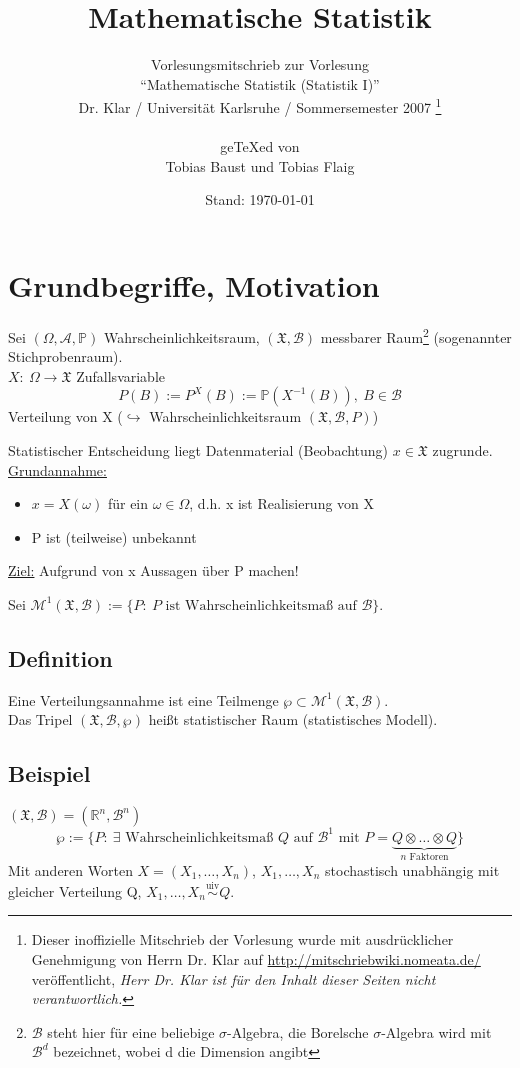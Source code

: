 \documentclass[a4paper,11pt,twoside,titlepage]{article}
\title{Mathematische Statistik}
\author{Vorlesungsmitschrieb zur Vorlesung\\ "`Mathematische Statistik (Statistik I)"'\\
Dr. Klar / Universität Karlsruhe / Sommersemester 2007
\footnote{
Dieser inoffizielle Mitschrieb der Vorlesung wurde mit ausdrücklicher Genehmigung von Herrn Dr. Klar auf \url{http://mitschriebwiki.nomeata.de/} veröffentlicht, \emph{Herr Dr. Klar ist für den Inhalt dieser Seiten nicht verantwortlich.}
}\\
~\\
ge\TeX ed von\\
Tobias Baust und Tobias Flaig}
\date{Stand: \today}
\newcommand{\R}{{\mathbb R}}
\newcommand{\PP}{{\mathbb P}} %
\newcommand{\XX}{{\mathfrak X}} %
\newcommand{\MM}{{\mathcal M}}
\newcommand\AAA{ \mathcal{A} } %
\newcommand\BB{ \mathcal{B} } %
\begin{document}
\setcounter{tocdepth}{1}
\renewcommand{\thepage}{\roman{page}}
\thispagestyle{empty}
\maketitle
\newpage
\thispagestyle{empty}
\tableofcontents
\thispagestyle{empty}
\cleardoublepage

\renewcommand{\thepage}{\arabic{page}}
\setcounter{page}{1}
\renewcommand{\thesection}{\arabic{section}}




\section{Grundbegriffe, Motivation}
Sei $(\Omega,\AAA,\PP)$ Wahrscheinlichkeitsraum, $(\XX,\BB)$ messbarer Raum\footnote{$\BB$ steht hier für eine beliebige $\sigma$-Algebra, die Borelsche $\sigma$-Algebra wird mit $\BB^d$ bezeichnet, wobei d die Dimension angibt} (sogenannter Stichprobenraum).\\
$X:\ \Omega\to\XX$ Zufallsvariable
\[P(B):=P^X(B):=\PP(X^{-1}(B)),\ B\in\BB\]
Verteilung von X ($\hookrightarrow$ Wahrscheinlichkeitsraum $(\XX,\BB,P)$)

Statistischer Entscheidung liegt Datenmaterial (Beobachtung) $x\in\XX$ zugrunde.\\
\underline{Grundannahme:}
\begin{itemize}
\item[1) ]$x=X(\omega)$ für ein $\omega\in\Omega$, d.h. x ist Realisierung von X
\item[2) ]P ist (teilweise) unbekannt
\end{itemize}
\underline{Ziel:} Aufgrund von x Aussagen über P machen!

Sei $\MM^1(\XX,\BB):=\{P:\ P\mbox{ ist Wahrscheinlichkeitsmaß auf }\BB\}$.

\subsection{Definition}
Eine Verteilungsannahme ist eine Teilmenge $\wp\subset\MM^1(\XX,\BB)$.\\
Das Tripel $(\XX,\BB,\wp)$ heißt statistischer Raum (statistisches Modell).

\subsection{Beispiel}
$(\XX,\BB)=(\R^n,\BB^n)$
\[\wp:=\{P:\ \exists\mbox{ Wahrscheinlichkeitsmaß } Q\mbox{ auf }\BB^1\mbox{ mit }P=\underbrace{Q\otimes\ldots\otimes Q}_{n\mbox{ Faktoren}}\}\]
Mit anderen Worten $X=(X_1,\ldots,X_n)$, $X_1,\ldots,X_n$ stochastisch unabhängig mit gleicher Verteilung Q, $X_1,\ldots,X_n\stackrel{\mbox{uiv}}{\sim}Q$.
\end{document}
